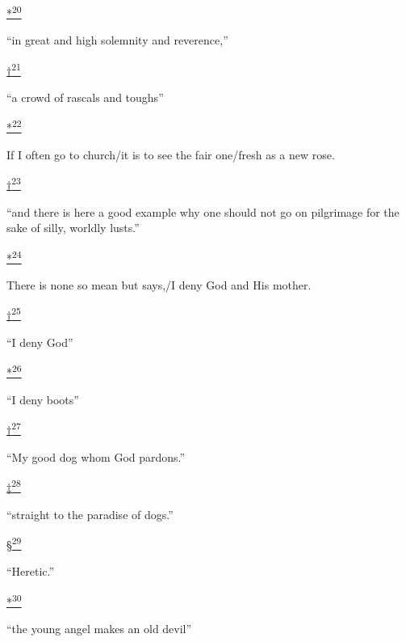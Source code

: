 \protect\hypertarget{23_NOTES.xhtmlux5cux23id_3028}{\protect\hyperlink{13_Chapter_Six__THE_DEPICTION_OF_TH.xhtmlux5cux23id_3027}{*\textsuperscript{20}}}
``in great and high solemnity and reverence,''

\protect\hypertarget{23_NOTES.xhtmlux5cux23id_3030}{\protect\hyperlink{13_Chapter_Six__THE_DEPICTION_OF_TH.xhtmlux5cux23id_3029}{†\textsuperscript{21}}}
``a crowd of rascals and toughs''

\protect\hypertarget{23_NOTES.xhtmlux5cux23id_3032}{\protect\hyperlink{13_Chapter_Six__THE_DEPICTION_OF_TH.xhtmlux5cux23id_3031}{*\textsuperscript{22}}}
If I often go to church/it is to see the fair one/fresh as a new rose.

\protect\hypertarget{23_NOTES.xhtmlux5cux23id_3034}{\protect\hyperlink{13_Chapter_Six__THE_DEPICTION_OF_TH.xhtmlux5cux23id_3033}{†\textsuperscript{23}}}
``and there is here a good example why one should not go on pilgrimage
for the sake of silly, worldly lusts.''

\protect\hypertarget{23_NOTES.xhtmlux5cux23id_3036}{\protect\hyperlink{13_Chapter_Six__THE_DEPICTION_OF_TH.xhtmlux5cux23id_3035}{*\textsuperscript{24}}}
There is none so mean but says,/I deny God and His mother.

\protect\hypertarget{23_NOTES.xhtmlux5cux23id_3038}{\protect\hyperlink{13_Chapter_Six__THE_DEPICTION_OF_TH.xhtmlux5cux23id_3037}{†\textsuperscript{25}}}
``I deny God''

\protect\hypertarget{23_NOTES.xhtmlux5cux23id_3040}{\protect\hyperlink{13_Chapter_Six__THE_DEPICTION_OF_TH.xhtmlux5cux23id_3039}{*\textsuperscript{26}}}
``I deny boots''

\protect\hypertarget{23_NOTES.xhtmlux5cux23id_3042}{\protect\hyperlink{13_Chapter_Six__THE_DEPICTION_OF_TH.xhtmlux5cux23id_3041}{†\textsuperscript{27}}}
``My good dog whom God pardons.''

\protect\hypertarget{23_NOTES.xhtmlux5cux23id_3044}{\protect\hyperlink{13_Chapter_Six__THE_DEPICTION_OF_TH.xhtmlux5cux23id_3043}{‡\textsuperscript{28}}}
``straight to the paradise of dogs.''

\protect\hypertarget{23_NOTES.xhtmlux5cux23id_3046}{\protect\hyperlink{13_Chapter_Six__THE_DEPICTION_OF_TH.xhtmlux5cux23id_3045}{§\textsuperscript{29}}}
``Heretic.''

\protect\hypertarget{23_NOTES.xhtmlux5cux23id_3048}{\protect\hyperlink{13_Chapter_Six__THE_DEPICTION_OF_TH.xhtmlux5cux23id_3047}{*\textsuperscript{30}}}
``the young angel makes an old devil''

